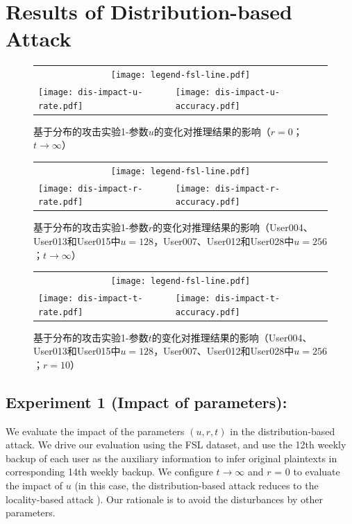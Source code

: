 \section{Results of Distribution-based Attack}
\label{sec:experiment-distribution}

\begin{figure}[!htbp]
    \centering
    \begin{tabular}{p{.48\linewidth}p{.48\linewidth}}
        \multicolumn{2}{c}{\texttt{[image: legend-fsl-line.pdf]}}  \\
        \texttt{[image: dis-impact-u-rate.pdf]} &
        \texttt{[image: dis-impact-u-accuracy.pdf]}\\
    \end{tabular}
    \caption{基于分布的攻击实验1-参数$u$的变化对推理结果的影响（$r = 0$；$t \rightarrow \infty$）}
    \label{fig:distribution-impact-u}
\end{figure}

\begin{figure}[!htbp]
    \centering
    \begin{tabular}{p{.48\linewidth}p{.48\linewidth}}
        \multicolumn{2}{c}{\texttt{[image: legend-fsl-line.pdf]}}  \\
        \texttt{[image: dis-impact-r-rate.pdf]} &
        \texttt{[image: dis-impact-r-accuracy.pdf]}\\
    \end{tabular}
    \caption{基于分布的攻击实验1-参数$r$的变化对推理结果的影响（User004、User013和User015中$u = 128$，User007、User012和User028中$u = 256$；$t \rightarrow \infty$）}
    \label{fig:distribution-impact-r}
\end{figure}

\begin{figure}[!htbp]
    \centering
    \begin{tabular}{p{.48\linewidth}p{.48\linewidth}}
        \multicolumn{2}{c}{\texttt{[image: legend-fsl-line.pdf]}}  \\
        \texttt{[image: dis-impact-t-rate.pdf]} &
        \texttt{[image: dis-impact-t-accuracy.pdf]}\\
    \end{tabular}
    \caption{基于分布的攻击实验1-参数$t$的变化对推理结果的影响（User004、User013和User015中$u = 128$，User007、User012和User028中$u = 256$；$r = 10$）}
    \label{fig:distribution-impact-t}
\end{figure}

\subsection{Experiment 1 (Impact of parameters):}
We evaluate the impact of the parameters $(u, r, t)$ in the distribution-based attack. We drive our evaluation using the FSL dataset, and use the 12th weekly backup of each user as the auxiliary information to infer original plaintexts in corresponding 14th weekly backup.  We configure $t \rightarrow \infty$ and $r$ = 0 to evaluate the impact of $u$ (in this case, the distribution-based attack reduces to the locality-based attack \cite{li17}). Our rationale is to avoid the disturbances by other parameters. 

